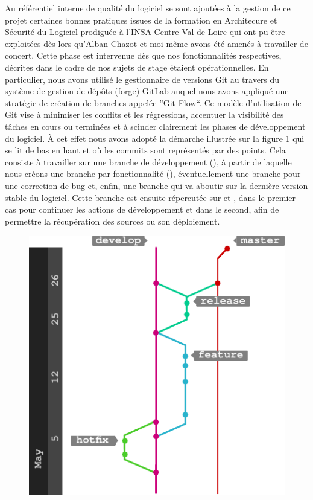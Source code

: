   Au référentiel interne de qualité du logiciel se sont ajoutées à la gestion de ce projet certaines bonnes pratiques issues de la formation en Architecure et Sécurité du Logiciel prodiguée à l'INSA Centre Val-de-Loire
  qui ont pu être exploitées dès lors qu'Alban Chazot et moi-même avons été amenés à travailler de concert.
  Cette phase est intervenue dès que nos fonctionnalités respectives, décrites dans le cadre de nos sujets de stage étaient opérationnelles.  
  En particulier, nous avons utilisé le gestionnaire de versions Git au travers du système de gestion de dépôts (forge) GitLab auquel nous avons appliqué une stratégie de création de branches appelée ''Git Flow``.
  Ce modèle d'utilisation de Git vise à minimiser les conflits et les régressions, accentuer la visibilité des tâches en cours ou terminées et à scinder clairement les phases de développement du logiciel. 
  \`{A} cet effet nous avons adopté la démarche illustrée sur la figure \ref{fig:gitflow} qui se lit de bas en haut et où les commits sont représentés par des points.
  Cela consiste à travailler sur une branche de développement (), à partir de laquelle nous créons une branche par fonctionnalité (), éventuellement une branche  pour une correction de bug
  et, enfin, une branche  qui va aboutir sur la dernière version stable du logiciel.
  Cette branche est ensuite répercutée sur  et , dans le premier cas  pour continuer les actions de développement et dans le second, afin de permettre la récupération des sources ou son déploiement. 
  
  \begin{figure}
    \centering
      \includegraphics[width=.6\linewidth]{figures/gitflow}  
    \label{fig:gitflow}
  \end{figure}
  
